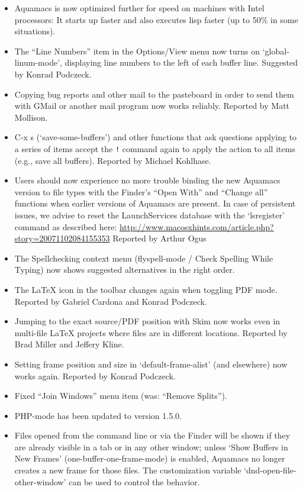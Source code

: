 \begin{itemize}


\item Aquamacs is now optimized further for speed on machines with Intel processors: It starts up faster and also executes lisp faster (up to 50\% in some situations).
\item The ``Line Numbers'' item in the Options/View menu now turns on `global-linum-mode', displaying line numbers to the left of each buffer line.
Suggested by Konrad Podczeck.
\item Copying bug reports and other mail to the pasteboard in order to send them with GMail or another mail program now works reliably.
Reported by Matt Mollison. %
\item C-x s (`save-some-buffers') and other functions that ask questions applying to a series of items accept the {\tt !} command again to apply the action to all items (e.g., save all buffers).
Reported by Michael Kohlhase.
\item Users should now experience no more trouble binding the new Aquamacs version to file types with the Finder's ``Open With'' and ``Change all'' functions when earlier versions of Aquamacs are present.  In case of persistent issues, we advise to reset the LaunchServices database with the `lsregister' command as described here:  \url{http://www.macosxhints.com/article.php?story=20071102084155353}
Reported by Arthur Ogus
\item The Spellchecking context menu (flyspell-mode / Check Spelling While Typing) now shows suggested alternatives in the right order. 
\item The LaTeX icon in the toolbar changes again when toggling PDF mode.
Reported by Gabriel Cardona and Konrad Podczeck.
\item Jumping to the exact source/PDF position with Skim now works even in multi-file LaTeX projects where files are in different locations.  
Reported by Brad Miller and Jeffery Kline.
\item Setting frame position and size in `default-frame-alist' (and elsewhere) now works again.
Reported by Konrad Podczeck.
\item Fixed ``Join Windows'' menu item (was: ``Remove Splits'').
\item PHP-mode has been updated to version 1.5.0.
\item Files opened from the command line or via the Finder will be shown if they are already visible in a tab or in any other window;  unless `Show Buffers in New Frames' (one-buffer-one-frame-mode) is enabled, Aquamacs no longer creates a new frame for those files.  The customization variable `dnd-open-file-other-window'  can be used to control the behavior.

\end{itemize}
